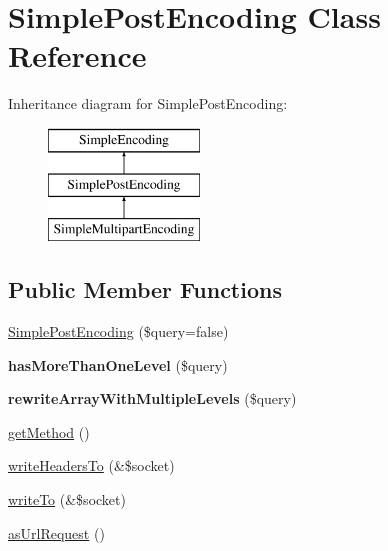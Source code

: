 \hypertarget{class_simple_post_encoding}{
\section{SimplePostEncoding Class Reference}
\label{class_simple_post_encoding}
}
Inheritance diagram for SimplePostEncoding:\begin{figure}[H]
\begin{center}
\leavevmode
\includegraphics[height=3.000000cm]{class_simple_post_encoding}
\end{center}
\end{figure}
\subsection*{Public Member Functions}
\begin{DoxyCompactItemize}
\item 
\hyperlink{class_simple_post_encoding_a15a21e5b65b2494c2e9136e18d05ff6b}{SimplePostEncoding} (\$query=false)
\item 
\hypertarget{class_simple_post_encoding_a3f6da8ff7afcf72408763f96beaf1d49}{
{\bfseries hasMoreThanOneLevel} (\$query)}
\label{class_simple_post_encoding_a3f6da8ff7afcf72408763f96beaf1d49}

\item 
\hypertarget{class_simple_post_encoding_a97293f288c50afa30e3d45ff9573dbe8}{
{\bfseries rewriteArrayWithMultipleLevels} (\$query)}
\label{class_simple_post_encoding_a97293f288c50afa30e3d45ff9573dbe8}

\item 
\hyperlink{class_simple_post_encoding_aa2adc333f1f0528f7f20afbd85b0f563}{getMethod} ()
\item 
\hyperlink{class_simple_post_encoding_a4e637e85bb8511a0b38e234388cb330b}{writeHeadersTo} (\&\$socket)
\item 
\hyperlink{class_simple_post_encoding_a45d035ce0ffe9358dd7e30c657f2fa5e}{writeTo} (\&\$socket)
\item 
\hyperlink{class_simple_post_encoding_a037637d756843001ce01261e253b16a3}{asUrlRequest} ()
\end{DoxyCompactItemize}


